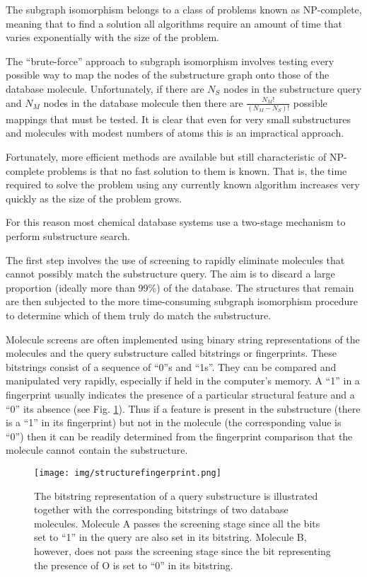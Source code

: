 \documentclass[thesis=M,english]{FITthesis}[2012/10/20]
\begin{document}
The subgraph isomorphism belongs to a class of problems known as NP-complete, meaning that to find a solution all algorithms require an amount of time that varies exponentially with the size of the problem. 

The ``brute-force'' approach to subgraph isomorphism involves testing every possible way to map the nodes of the substructure graph onto those of the database molecule. Unfortunately, if there are $N_S$ nodes in the substructure query and $N_M$ nodes in the database molecule then there are $\frac{N_M!}{(N_M-N_S)!}$ possible mappings that must be tested.\cite{intro} It is clear that even for very small substructures and molecules with modest numbers of atoms this is an impractical approach. 

Fortunately, more efficient methods are available but still characteristic of NP-complete problems is that no fast solution to them is known. That is, the time required to solve the problem using any currently known algorithm increases very quickly as the size of the problem grows.

For this reason most chemical database systems use a two-stage mechanism to perform substructure search. 

The first step involves the use of screening to rapidly eliminate molecules that cannot possibly match the substructure query. The aim is to discard a large proportion (ideally more than 99\%) of the database. The structures that remain are then subjected to the more time-consuming subgraph isomorphism procedure to determine which of them truly do match the substructure. 

Molecule screens are often implemented using binary string representations of the molecules and the query substructure called bitstrings or fingerprints. These bitstrings consist of a sequence of ``0''s and ``1s''. They can be compared and manipulated very rapidly, especially if held in the computer’s memory. A ``1'' in a fingerprint usually indicates the presence of a particular structural feature and a ``0'' its absence (see Fig. \ref{fig:structureFingerprint}). Thus if a feature is present in the substructure (there is a ``1'' in its fingerprint) but not in the molecule (the corresponding value is ``0'') then it can be readily determined from the fingerprint comparison that the molecule cannot contain the substructure.\cite{intro}

\begin{figure}
  \centering
  \texttt{[image: img/structurefingerprint.png]}
  \caption{The bitstring representation of a query substructure is illustrated together with the
corresponding bitstrings of two database molecules. Molecule A passes the screening stage since
all the bits set to ``1'' in the query are also set in its bitstring. Molecule B, however, does not pass
the screening stage since the bit representing the presence of O is set to ``0'' in its bitstring.}
  \label{fig:structureFingerprint}
\end{figure}
\end{document}
